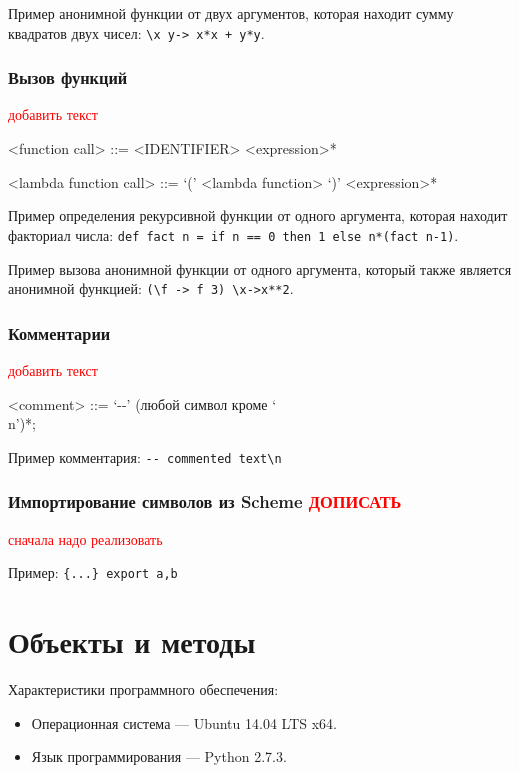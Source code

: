 \documentclass[12pt,a4paper,oneside]{extarticle}
\begin{document}
            Пример анонимной функции от двух аргументов, которая находит сумму квадратов двух чисел: \lstinline$\x y-> x*x + y*y$.

        \subsubsection{Вызов функций}
            \textcolor{red}{добавить текст}

            \begin{grammar}
                <function call> ::= <IDENTIFIER> <expression>*

                <lambda function call> ::= `(' <lambda function> `)' <expression>*
            \end{grammar}

            Пример определения рекурсивной функции от одного аргумента, которая находит факториал числа: \lstinline$def fact n = if n == 0 then 1 else n*(fact n-1)$.

            Пример вызова анонимной функции от одного аргумента, который также является анонимной функцией: \lstinline$(\f -> f 3) \x->x**2$.

        \subsubsection{Комментарии}
            \textcolor{red}{добавить текст}

            \begin{grammar}
                <comment> ::= `-\null-' (любой символ кроме `\\n')*;
            \end{grammar}

            Пример комментария: \lstinline$-- commented text\n$
            

        \subsubsection{Импортирование символов из Scheme \textcolor{red}{ДОПИСАТЬ}}
            \textcolor{red}{сначала надо реализовать}

            Пример: \lstinline${...} export a,b$
        
\clearpage

\section{Объекты и методы}
\label{sec:configuration} 
        \noindent Характеристики программного обеспечения:
        \begin{itemize}
            \item Операционная система --- Ubuntu 14.04 LTS x64.
            \item Язык программирования --- Python 2.7.3.
        \end{itemize}
        
\end{document}
